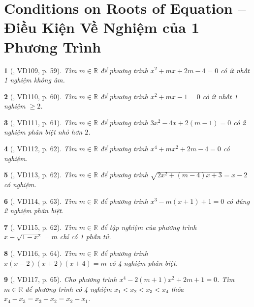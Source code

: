 \documentclass{article}
\newtheorem{baitoan}{}
\begin{document}
\section{Conditions on Roots of Equation -- Điều Kiện Về Nghiệm của 1 Phương Trình}

\begin{baitoan}[\cite{Binh_Toan_9_tap_2}, VD109, p. 59]
	Tìm $m\in\mathbb{R}$ để phương trình $x^2 + mx + 2m - 4 = 0$ có ít nhất 1 nghiệm không âm.
\end{baitoan}

\begin{baitoan}[\cite{Binh_Toan_9_tap_2}, VD110, p. 60]
	Tìm $m\in\mathbb{R}$ để phương trình $x^2 + mx - 1 = 0$ có ít nhất 1 nghiệm $\ge2$.
\end{baitoan}

\begin{baitoan}[\cite{Binh_Toan_9_tap_2}, VD111, p. 61]
	Tìm $m\in\mathbb{R}$ để phương trình $3x^2 - 4x + 2(m - 1) = 0$ có 2 nghiệm phân biệt nhỏ hơn $2$.
\end{baitoan}

\begin{baitoan}[\cite{Binh_Toan_9_tap_2}, VD112, p. 62]
	Tìm $m\in\mathbb{R}$ để phương trình $x^4 + mx^2 + 2m - 4 = 0$ có nghiệm.
\end{baitoan}

\begin{baitoan}[\cite{Binh_Toan_9_tap_2}, VD113, p. 62]
	Tìm $m\in\mathbb{R}$ để phương trình $\sqrt{2x^2 + (m - 4)x + 3} = x - 2$ có nghiệm.
\end{baitoan}

\begin{baitoan}[\cite{Binh_Toan_9_tap_2}, VD114, p. 63]
	Tìm $m\in\mathbb{R}$ để phương trình $x^3 - m(x + 1) + 1 = 0$ có đúng 2 nghiệm phân biệt.
\end{baitoan}

\begin{baitoan}[\cite{Binh_Toan_9_tap_2}, VD115, p. 62]
	Tìm $m\in\mathbb{R}$ để tập nghiệm của phương trình $x - \sqrt{1 - x^2} = m$ chỉ có 1 phần tử.
\end{baitoan}

\begin{baitoan}[\cite{Binh_Toan_9_tap_2}, VD116, p. 64]
	Tìm $m\in\mathbb{R}$ để phương trình $x(x - 2)(x + 2)(x + 4) = m$ có 4 nghiệm phân biệt.
\end{baitoan}

\begin{baitoan}[\cite{Binh_Toan_9_tap_2}, VD117, p. 65]
	Cho phương trình $x^4 - 2(m + 1)x^2 + 2m + 1 = 0$. Tìm $m\in\mathbb{R}$ để phương trình có 4 nghiệm $x_1 < x_2 < x_3 < x_4$ thỏa $x_4 - x_3 = x_3 - x_2 = x_2 - x_1$.
\end{baitoan}
\end{document}
